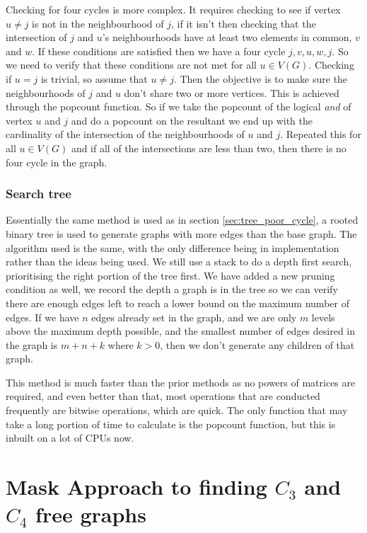 \documentclass[a4paper]{article}
\begin{document}
Checking for four cycles is more complex. It requires checking to see if vertex $u\not= j$ is not in the neighbourhood of $j$, if it isn't then checking that the intersection of $j$ and $u$'s neighbourhoods have at least two elements in common, $v$ and $w$. If these conditions are satisfied then we have a four cycle $j,v,u,w,j$. So we need to verify that these conditions are not met for all $u\in V(G)$. Checking if $u=j$ is trivial, so assume that $u\not= j$. Then the objective is to make sure the neighbourhoods of $j$ and $u$ don't share two or more vertices. This is achieved through the popcount function. So if we take the popcount of the logical \emph{and} of vertex $u$ and $j$ and do a popcount on the resultant we end up with the cardinality of the intersection of the neighbourhoods of $u$ and $j$. Repeated this for all $u\in V(G)$ and if all of the intersections are less than two, then there is no four cycle in the graph.

\subsubsection{Search tree}
\label{sec:search_tree_one}
Essentially the same method is used as in section \ref{sec:tree_poor_cycle}, a rooted binary tree is used to generate graphs with more edges than the base graph. The algorithm used is the same, with the only difference being in implementation rather than the ideas being used. We still use a stack to do a depth first search, prioritising the right portion of the tree first. We have added a new pruning condition as well, we record the depth a graph is in the tree so we can verify there are enough edges left to reach a lower bound on the maximum number of edges. If we have $n$ edges already set in the graph, and we are only $m$ levels above the maximum depth possible, and the smallest number of edges desired in the graph is $m+n+k$ where $k>0$, then we don't generate any children of that graph.

This method is much faster than the prior methods as no powers of matrices are required, and even better than that, most operations that are conducted frequently are bitwise operations, which are quick. The only function that may take a long portion of time to calculate is the popcount function, but this is inbuilt on a lot of CPUs now.

\section{Mask Approach to finding $C_3$ and $C_4$ free graphs}
\end{document}
